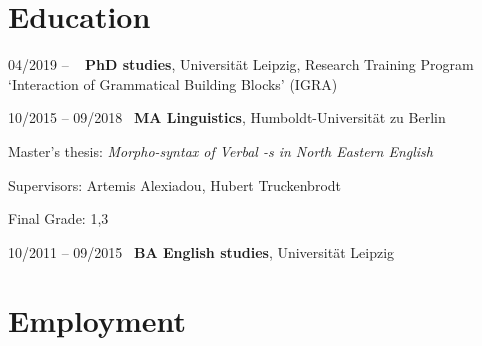 \documentclass[11pt]{article}
\begin{document}


\section*{Education}


\begin{list}{}{
			\setlength{\leftmargin}{3.5cm}
			\setlength{\itemindent}{-2.5cm}
		}
	\item[04/2019 -- \phantom{09/2018}~] \textbf{PhD studies}, Universität Leipzig, Research Training Program `Interaction of Grammatical Building Blocks' (IGRA)
 
	\item[10/2015 -- 09/2018~] \textbf{MA Linguistics}, Humboldt-Universität zu Berlin
	\vspace{-.5em}
	\begin{list}{}{
			\setlength{\leftmargin}{1cm}
			\setlength{\itemindent}{-1cm}
		}
	\item Master's thesis: \textit{Morpho-syntax of Verbal \textit{-s} in North Eastern English}
	\item Supervisors: Artemis Alexiadou, Hubert Truckenbrodt
	\item Final Grade: 1,3
	\end{list}

	\item[10/2011 -- 09/2015~] \textbf{BA English studies}, Universität Leipzig
\end{list}

\section*{Employment}
\end{document}
